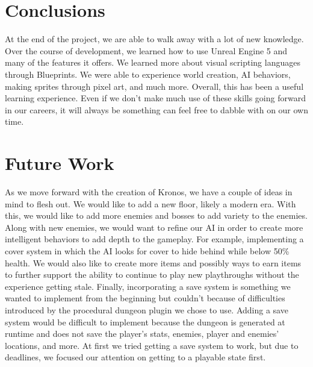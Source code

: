 \documentclass{sigchi}
\begin{document}
\section{Conclusions}
At the end of the project, we are able to walk away with a lot of new knowledge. Over the course of development, we learned how to use Unreal Engine 5 and many of the features it offers. We learned more about visual scripting languages through Blueprints. We were able to experience world creation, AI behaviors, making sprites through pixel art, and much more. Overall, this has been a useful learning experience. Even if we don't make much use of these skills going forward in our careers, it will always be something can feel free to dabble with on our own time.

\section{Future Work}
As we move forward with the creation of Kronos, we have a couple of ideas in mind to flesh out. We would like to add a new floor, likely a modern era. With this, we would like to add more enemies and bosses to add variety to the enemies. Along with new enemies, we would want to refine our AI in order to create more intelligent behaviors to add depth to the gameplay. For example, implementing a cover system in which the AI looks for cover to hide behind while below 50\% health. We would also like to create more items and possibly ways to earn items to further support the ability to continue to play new playthroughs without the experience getting stale. Finally, incorporating a save system is something we wanted to implement from the beginning but couldn't because of difficulties introduced by the procedural dungeon plugin we chose to use. Adding a save system would be difficult to implement because the dungeon is generated at runtime and does not save the player's stats, enemies, player and enemies' locations, and more. At first we tried getting a save system to work, but due to deadlines, we focused our attention on getting to a playable state first.
\end{document}
